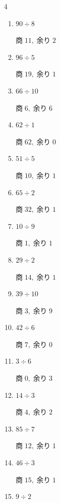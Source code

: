 \begin{multicols}{4}
\begin{enumerate}
        $商\; 48,\; 余り\; 1$

  \item $90 \div 8$

        $商\; 11,\; 余り\; 2$

  \item $96 \div 5$

        $商\; 19,\; 余り\; 1$

  \item $66 \div 10$

        $商\; 6,\; 余り\; 6$

  \item $62 \div 1$

        $商\; 62,\; 余り\; 0$

  \item $51 \div 5$

        $商\; 10,\; 余り\; 1$

  \item $65 \div 2$

        $商\; 32,\; 余り\; 1$

  \item $10 \div 9$

        $商\; 1,\; 余り\; 1$

  \item $29 \div 2$

        $商\; 14,\; 余り\; 1$

  \item $39 \div 10$

        $商\; 3,\; 余り\; 9$

\columnbreak %

  \item $42 \div 6$

        $商\; 7,\; 余り\; 0$

  \item $3 \div 6$

        $商\; 0,\; 余り\; 3$

  \item $14 \div 3$

        $商\; 4,\; 余り\; 2$

  \item $85 \div 7$

        $商\; 12,\; 余り\; 1$

  \item $46 \div 3$

        $商\; 15,\; 余り\; 1$

  \item $9 \div 2$


\end{enumerate}
\end{multicols}
